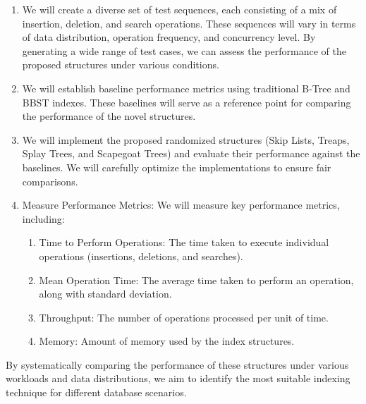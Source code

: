 \documentclass[sigconf]{acmart}
\begin{document}
\begin{enumerate}
    \item We will create a diverse set of test sequences, each consisting of a mix of insertion, deletion, and search operations. These sequences will vary in terms of data distribution, operation frequency, and concurrency level. By generating a wide range of test cases, we can assess the performance of the proposed structures under various conditions.

    \item We will establish baseline performance metrics using traditional B-Tree and BBST indexes. These baselines will serve as a reference point for comparing the performance of the novel structures.

    \item  We will implement the proposed randomized structures (Skip Lists, Treaps, Splay Trees, and Scapegoat Trees) and evaluate their performance against the baselines. We will carefully optimize the implementations to ensure fair comparisons.

    \item Measure Performance Metrics: We will measure key performance metrics, including:
    \begin{enumerate}
        \item Time to Perform Operations: The time taken to execute individual operations (insertions, deletions, and searches).
        
        \item Mean Operation Time: The average time taken to perform an operation, along with standard deviation.

        \item Throughput: The number of operations processed per unit of time.

        \item Memory: Amount of memory used by the index structures.
    \end{enumerate}
\end{enumerate}
        

By systematically comparing the performance of these structures under various workloads and data distributions, we aim to identify the most suitable indexing technique for different database scenarios.

\clearpage



\end{document}
